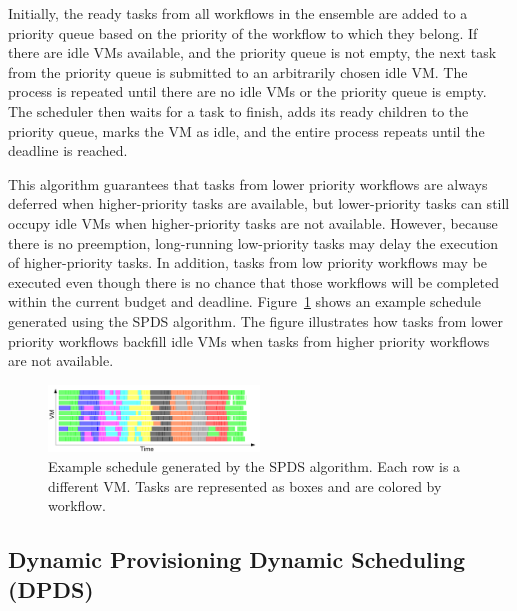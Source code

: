 \documentclass[conference]{IEEEtran}
\begin{document}
Initially, the ready tasks from all workflows in the ensemble are added to a priority queue based on the priority of the workflow to which they belong. If there are idle VMs available, and the priority queue is not empty, the next task from the priority queue is submitted to an arbitrarily chosen idle VM. The process is repeated until there are no idle VMs or the priority queue is empty. The scheduler then waits for a task to finish, adds its ready children to the priority queue, marks the VM as idle, and the entire process repeats until the deadline is reached.

This algorithm guarantees that tasks from lower priority workflows are always deferred when higher-priority tasks are available, but lower-priority tasks can still occupy idle VMs when higher-priority tasks are not available. However, because there is no preemption, long-running low-priority tasks may delay the execution of higher-priority tasks. In addition, tasks from low priority workflows may be executed even though there is no chance that those workflows will be completed within the current budget and deadline. Figure~\ref{fig:spds-example} shows an example schedule generated using the SPDS algorithm. The figure illustrates how tasks from lower priority workflows backfill idle VMs when tasks from higher priority workflows are not available.

\begin{figure}[tb]
  \centering
  \includegraphics[width=0.5\textwidth]{figures/spds-gantt}
  \caption[Example schedule generated by the SPDS algorithm.]{Example schedule generated by the SPDS algorithm. Each row is a different VM. Tasks are represented as boxes and are colored by workflow.}
  \label{fig:spds-example}
\end{figure}


\subsection{Dynamic Provisioning Dynamic Scheduling (DPDS)}
 
\end{document}
